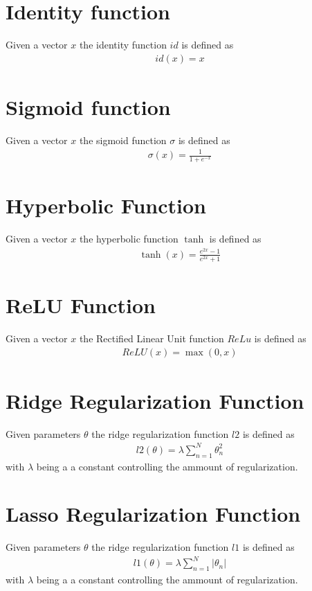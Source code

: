 \section{Identity function}
Given a vector $x$ the identity function $id$ is defined as 
\begin{gather}
    \label{identity}
    id(x) = x
\end{gather}

\section{Sigmoid function}
Given a vector $x$ the sigmoid function $\sigma$ is defined as 
\begin{gather}
    \label{sigmoid}
    \sigma(x) = \frac {1} {1 + e^{-x}}
\end{gather}

\section{Hyperbolic Function}
Given a vector $x$ the hyperbolic function $\tanh$ is defined as 
\begin{gather}
    \label{tanh}
    \tanh(x) = \frac {e^{2x} -1} {e^{2x} +1}
\end{gather}

\section{ReLU Function}
Given a vector $x$ the Rectified Linear Unit function $ReLu$ is defined as 
\begin{gather}
    \label{relu}
    ReLU(x) = \max(0, x)
\end{gather}

\section{Ridge Regularization Function}
Given parameters $\theta$ the ridge regularization function $l2$ is defined as 
\begin{gather}
    \label{ridge}
    l2(\theta) = \lambda \sum_{n=1}^{N}\theta_n^2
\end{gather}
with $\lambda$ being a a constant controlling the ammount of regularization.

\section{Lasso Regularization Function}
Given parameters $\theta$ the ridge regularization function $l1$ is defined as 
\begin{gather}
    \label{lasso}
    l1(\theta) = \lambda \sum_{n=1}^{N}|\theta_n|
\end{gather}
with $\lambda$ being a a constant controlling the ammount of regularization.

